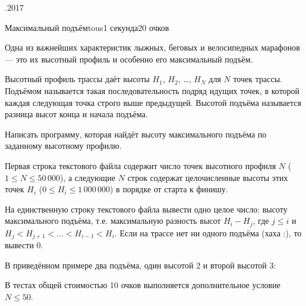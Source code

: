 \documentclass[a4paper,11pt]{article}
\begin{document}
\begin{ol}{\eio}{.2017}{\yle}{}
\begin{yl}{1}{Максимальный подъём}{tous}{1 секунда}{20 очков}

Одна из важнейших характеристик лыжных, беговых и велосипедных марафонов --- это их высотный профиль и особенно его максимальный подъём.

Высотный профиль трассы даёт высоты $H_1$, $H_2$, \dots, $H_N$ для $N$ точек трассы. Подъёмом называется такая последовательность подряд идущих точек, в которой каждая следующая точка строго выше предыдущей. Высотой подъёма называется разница высот конца и начала подъёма.

Написать программу, которая найдёт высоту максимального подъёма по заданному высотному профилю.

\sis Первая строка текстового файла \sisf содержит число точек высотного профиля $N$ ($1 \le N \le 50\,000$), а следующие $N$ строк содержат целочисленные высоты этих точек $H_i$ ($0 \le H_i \le 1\,000\,000$) в порядке от старта к финишу.

\val На единственную строку текстового файла \valf вывести одно целое число: высоту максимального подъёма, т.е. максимальную разность высот $H_i - H_j$, где $j \le i$ и $H_j < H_{j+1} < \dots < H_{i-1} < H_i$. Если на трассе нет ни одного подъёма (хаха :), то вывести 0.

\nde[0]{3cm}{3cm}

В приведённом примере два подъёма, один высотой 2 и второй высотой 3:


\hnd В тестах общей стоимостью 10 очков выполняется дополнительное условие $N \le 50$.

\end{yl}
\end{ol}
\end{document}

